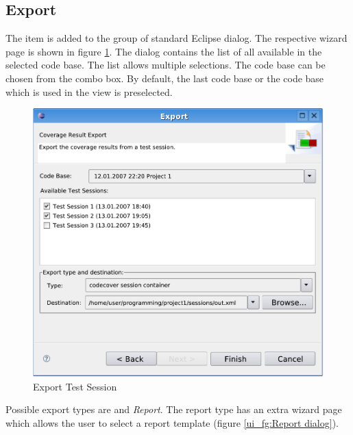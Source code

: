 \subsection{Export} \label{ui:Export}
The item  is added to the  group of standard Eclipse  dialog. The respective wizard page is shown in figure \ref{ui_fg:Export Test Session}. The dialog contains the list of all available  in the selected code base. The list  allows multiple selections. The code base can be chosen from the combo box. By default, the last code base or the code base which is used in the  view is preselected.
\begin{figure}[hbtp]
 \centering
 \includegraphics[]{images/Test_Case_Administration_View/Export_Session}
 \caption{Export Test Session}
 \label{ui_fg:Export Test Session}
\end{figure}
\par
Possible export types are  and \textit{Report}. The report type has an extra wizard page which allows the user to select a report template (figure \ref{ui_fg:Report dialog}).

